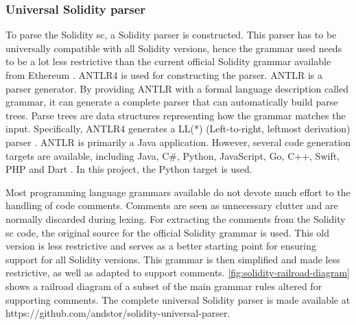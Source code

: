 \subsubsection{Universal Solidity parser}
\label{sec:universal-solidity-parser}
To parse the Solidity \acrshort{sc}, a Solidity parser is constructed. This parser has to be universally compatible with all Solidity versions, hence the grammar used needs to be a lot less restrictive than the current official Solidity grammar available from Ethereum \cite{soliditygrammar}. ANTLR4 \cite{antlr4} is used for constructing the parser. ANTLR is a parser generator. By providing ANTLR with a formal language description called grammar, it can generate a complete parser that can automatically build parse trees. Parse trees are data structures representing how the grammar matches the input. Specifically, ANTLR4 generates a LL(*) (Left-to-right, leftmost derivation) parser \cite{parr2011llstar}. ANTLR is primarily a Java application. However, several code generation targets are available, including Java, C\#, Python, JavaScript, Go, C++, Swift, PHP and Dart \cite{antlr-targets}. In this project, the Python target is used.

Most programming language grammars available do not devote much effort to the handling of code comments. Comments are seen as unnecessary clutter and are normally discarded during lexing. For extracting the comments from the Solidity \acrshort{sc} code, the original source \cite{solidity-antlr4} for the official Solidity grammar \cite{soliditygrammar} is used. This old version  is less restrictive and serves as a better starting point for ensuring support for all Solidity versions. This grammar is then simplified and made less restrictive, as well as adapted to support comments. \cref{fig:solidity-railroad-diagram} shows a railroad diagram of a subset of the main grammar rules altered for supporting comments. The complete universal Solidity parser is made available at https://github.com/andstor/solidity-universal-parser.

